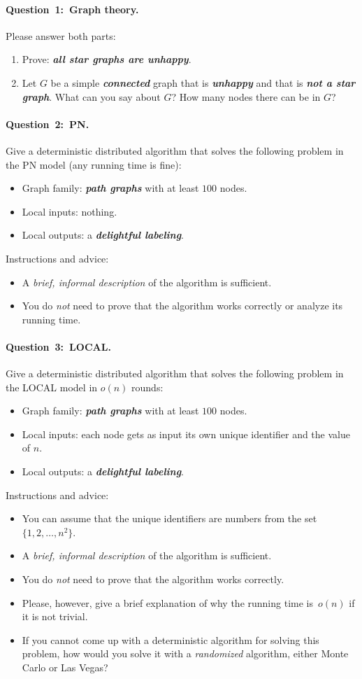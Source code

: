 \documentclass[12pt,a4paper]{article}
\newcommand{\q}[2]{\paragraph{\mbox{Question #1: }#2.}}
\newcommand{\hl}[1]{\textbf{\emph{#1}}}
\newcommand{\cemph}[1]{\textcolor{hlcolor}{\emph{#1}}}
\begin{document}
\newpage

\q{1}{Graph theory}

Please answer both parts:
\begin{enumerate}[label=(\alph*),leftmargin=*]
    \item Prove: \hl{all star graphs are unhappy}.
    \item Let $G$ be a simple \hl{connected} graph that is \hl{unhappy} and that is \hl{not a star graph}. What can you say about $G$? How many nodes there can be in $G$?
\end{enumerate}

\q{2}{PN}

Give a deterministic distributed algorithm that solves the following problem in the PN model (any running time is fine):
\begin{itemize}
    \item Graph family: \hl{path graphs} with at least $100$ nodes.
    \item Local inputs: nothing.
    \item Local outputs: a \hl{delightful labeling}.
\end{itemize}
Instructions and advice:
\begin{itemize}
    \item A \cemph{brief, informal description} of the algorithm is sufficient.
    \item You do \emph{not} need to prove that the algorithm works correctly or analyze its running time.
\end{itemize}

\q{3}{LOCAL}

Give a deterministic distributed algorithm that solves the following problem in the LOCAL model in {\boldmath $o(n)$} rounds:
\begin{itemize}
    \item Graph family: \hl{path graphs} with at least $100$ nodes.
    \item Local inputs: each node gets as input its own unique identifier and the value of $n$.
    \item Local outputs: a \hl{delightful labeling}.
\end{itemize}
Instructions and advice:
\begin{itemize}
    \item You can assume that the unique identifiers are numbers from the set $\{1,2,\dotsc,n^2\}$.
    \item A \cemph{brief, informal description} of the algorithm is sufficient.
    \item You do \emph{not} need to prove that the algorithm works correctly.
    \item Please, however, give a brief explanation of why the running time is~$o(n)$ if it is not trivial.
    \item If you cannot come up with a deterministic algorithm for solving this problem, how would you solve it with a \emph{randomized} algorithm, either Monte Carlo or Las Vegas?
\end{itemize}
\end{document}
